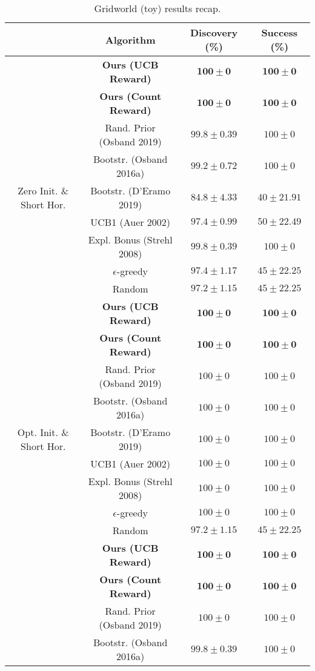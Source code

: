 \documentclass{article}
\begin{document}
\begin{table}[h]
\centering
\caption{Gridworld (toy) results recap.}
\begin{tabular}{ c | c | c c }
 & Algorithm & Discovery (\%) & Success (\%) \\
 \hline
 & \textbf{Ours (UCB Reward)} & $\mathbf{100 \pm 0}$ & $\mathbf{100 \pm 0}$ \\
 & \textbf{Ours (Count Reward)} & $\mathbf{100 \pm 0}$ & $\mathbf{100 \pm 0}$ \\
 & Rand. Prior (Osband 2019) & $99.8 \pm 0.39$ & $100 \pm 0$ \\
 & Bootstr. (Osband 2016a) & $99.2 \pm 0.72$ & $100 \pm 0$ \\
 Zero Init. \& Short Hor. & Bootstr. (D'Eramo 2019) & $84.8 \pm 4.33$ & $40 \pm 21.91$ \\
 & UCB1 (Auer 2002) & $97.4 \pm 0.99$ & $50 \pm 22.49$ \\
 & Expl. Bonus (Strehl 2008) & $99.8 \pm 0.39$ & $100 \pm 0$ \\
 & $\epsilon$-greedy & $97.4 \pm 1.17$ & $45 \pm 22.25$ \\
 & Random & $97.2 \pm 1.15$ & $45 \pm 22.25$ \\
 \hline
 & \textbf{Ours (UCB Reward)} & $\mathbf{100 \pm 0}$ & $\mathbf{100 \pm 0}$ \\
 & \textbf{Ours (Count Reward)} & $\mathbf{100 \pm 0}$ & $\mathbf{100 \pm 0}$ \\
 & Rand. Prior (Osband 2019) & $100 \pm 0$ & $100 \pm 0$ \\
 & Bootstr. (Osband 2016a) & $100 \pm 0$ & $100 \pm 0$ \\
 Opt. Init. \& Short Hor. & Bootstr. (D'Eramo 2019) & $100 \pm 0$ & $100 \pm 0$ \\
 & UCB1 (Auer 2002) & $100 \pm 0$ & $100 \pm 0$ \\
 & Expl. Bonus (Strehl 2008) & $100 \pm 0$ & $100 \pm 0$ \\
 & $\epsilon$-greedy & $100 \pm 0$ & $100 \pm 0$ \\
 & Random & $97.2 \pm 1.15$ & $45 \pm 22.25$ \\
 \hline
 & \textbf{Ours (UCB Reward)} & $\mathbf{100 \pm 0}$ & $\mathbf{100 \pm 0}$ \\
 & \textbf{Ours (Count Reward)} & $\mathbf{100 \pm 0}$ & $\mathbf{100 \pm 0}$ \\
 & Rand. Prior (Osband 2019) & ${100 \pm 0}$ & ${100 \pm 0}$ \\
 & Bootstr. (Osband 2016a) & $99.8 \pm 0.39$ & $100 \pm 0$ \\

\end{tabular}
\end{table}
\end{document}
